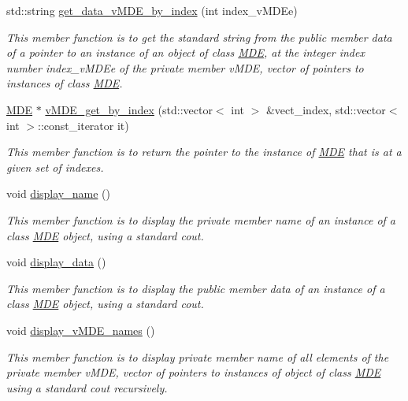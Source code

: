 \begin{DoxyCompactItemize}
std\+::string \hyperlink{group__group__get_ga4ceb5c957197f9a85998d111d2308452}{get\+\_\+data\+\_\+v\+M\+D\+E\+\_\+by\+\_\+index} (int index\+\_\+v\+M\+D\+Ee)
\begin{DoxyCompactList}\small\item\em This member function is to get the standard string from the public member \textquotesingle{}data\textquotesingle{} of a pointer to an instance of an object of class \hyperlink{classMDE}{M\+DE}, at the integer index number index\+\_\+v\+M\+D\+Ee of the private member v\+M\+DE, vector of pointers to instances of class \hyperlink{classMDE}{M\+DE}. \end{DoxyCompactList}\item 
\hyperlink{classMDE}{M\+DE} $\ast$ \hyperlink{group__group__get_gab0c2bc0e33b0b3c651e56141cefc2f8b}{v\+M\+D\+E\+\_\+get\+\_\+by\+\_\+index} (std\+::vector$<$ int $>$ \&vect\+\_\+index, std\+::vector$<$ int $>$\+::const\+\_\+iterator it)
\begin{DoxyCompactList}\small\item\em This member function is to return the pointer to the instance of \hyperlink{classMDE}{M\+DE} that is at a given set of indexes. \end{DoxyCompactList}\item 
void \hyperlink{group__group__display_ga0d7ee634770bb7ca539a0db883bf5fcb}{display\+\_\+name} ()
\begin{DoxyCompactList}\small\item\em This member function is to display the private member \textquotesingle{}name\textquotesingle{} of an instance of a class \hyperlink{classMDE}{M\+DE} object, using a standard cout. \end{DoxyCompactList}\item 
void \hyperlink{group__group__display_gaffa6663eb89b6e57cb430677067efe8e}{display\+\_\+data} ()
\begin{DoxyCompactList}\small\item\em This member function is to display the public member \textquotesingle{}data\textquotesingle{} of an instance of a class \hyperlink{classMDE}{M\+DE} object, using a standard cout. \end{DoxyCompactList}\item 
void \hyperlink{group__group__display_gaeabe618359d94d130bcd4bc878ce3edc}{display\+\_\+v\+M\+D\+E\+\_\+names} ()
\begin{DoxyCompactList}\small\item\em This member function is to display private member \textquotesingle{}name\textquotesingle{} of all elements of the private member v\+M\+DE, vector of pointers to instances of object of class \hyperlink{classMDE}{M\+DE} using a standard cout recursively. \end{DoxyCompactList}\item 

\end{DoxyCompactItemize}
